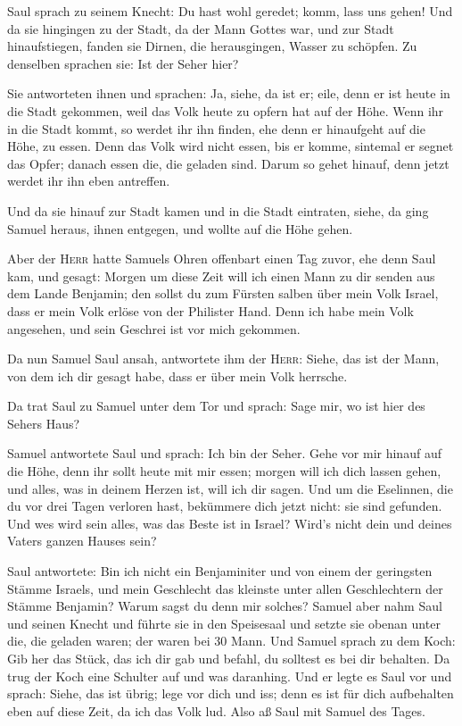  Saul sprach zu seinem Knecht: Du hast wohl geredet;
komm, lass uns gehen! Und da sie hingingen zu der Stadt, da der Mann
Gottes war,  und zur Stadt hinaufstiegen, fanden sie
Dirnen, die herausgingen, Wasser zu schöpfen. Zu denselben sprachen sie:
Ist der Seher hier?

 Sie antworteten ihnen und sprachen: Ja, siehe, da ist
er; eile, denn er ist heute in die Stadt gekommen, weil das Volk heute
zu opfern hat auf der Höhe.  Wenn ihr in die Stadt kommt,
so werdet ihr ihn finden, ehe denn er hinaufgeht auf die Höhe, zu essen.
Denn das Volk wird nicht essen, bis er komme, sintemal er segnet das
Opfer; danach essen die, die geladen sind. Darum so gehet hinauf, denn
jetzt werdet ihr ihn eben antreffen.

 Und da sie hinauf zur Stadt kamen und in die Stadt
eintraten, siehe, da ging Samuel heraus, ihnen entgegen, und wollte auf
die Höhe gehen.

 Aber der \textsc{Herr} hatte Samuels Ohren offenbart
einen Tag zuvor, ehe denn Saul kam, und gesagt:  Morgen
um diese Zeit will ich einen Mann zu dir senden aus dem Lande Benjamin;
den sollst du zum Fürsten salben über mein Volk Israel, dass er mein
Volk erlöse von der Philister Hand. Denn ich habe mein Volk angesehen,
und sein Geschrei ist vor mich gekommen.

 Da nun Samuel Saul ansah, antwortete ihm der
\textsc{Herr}: Siehe, das ist der Mann, von dem ich dir gesagt habe,
dass er über mein Volk herrsche.

 Da trat Saul zu Samuel unter dem Tor und sprach: Sage
mir, wo ist hier des Sehers Haus?

 Samuel antwortete Saul und sprach: Ich bin der Seher.
Gehe vor mir hinauf auf die Höhe, denn ihr sollt heute mit mir essen;
morgen will ich dich lassen gehen, und alles, was in deinem Herzen ist,
will ich dir sagen.  Und um die Eselinnen, die du vor
drei Tagen verloren hast, bekümmere dich jetzt nicht: sie sind gefunden.
Und wes wird sein alles, was das Beste ist in Israel? Wird's nicht dein
und deines Vaters ganzen Hauses sein?

 Saul antwortete: Bin ich nicht ein Benjaminiter und von
einem der geringsten Stämme Israels, und mein Geschlecht das kleinste
unter allen Geschlechtern der Stämme Benjamin? Warum sagst du denn mir
solches?  Samuel aber nahm Saul und seinen Knecht und
führte sie in den Speisesaal und setzte sie obenan unter die, die
geladen waren; der waren bei 30 Mann.  Und Samuel sprach
zu dem Koch: Gib her das Stück, das ich dir gab und befahl, du solltest
es bei dir behalten.  Da trug der Koch eine Schulter auf
und was daranhing. Und er legte es Saul vor und sprach: Siehe, das ist
übrig; lege vor dich und iss; denn es ist für dich aufbehalten eben auf
diese Zeit, da ich das Volk lud. Also aß Saul mit Samuel des Tages.

